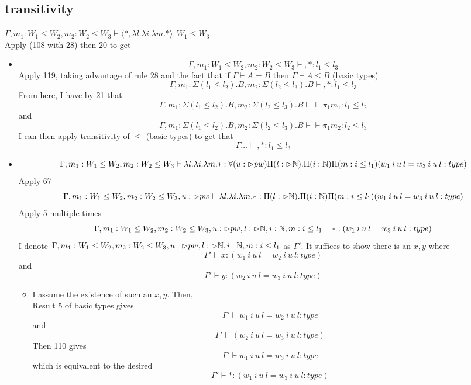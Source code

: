 \documentclass{article}
\begin{document}
\subsection{transitivity}
$\Gamma, m_1: W_1 \leq W_2, m_2 : W_2 \leq W_3 \vdash \langle *,
\lambda l. \lambda i. \lambda m. * \rangle
: W_1 \leq W_3$\\
Apply (108 with 28) then 20 to get
\begin{itemize}
    \item \[\Gamma, m_1: W_1 \leq W_2, m_2 : W_2 \leq W_3 \vdash, *: l_1 \leq l_3\]
    Apply 119, taking advantage of rule 28 and the fact that if $\Gamma \vdash A = B$ then $\Gamma \vdash A \leq B$ (basic types)
    \[\Gamma, m_1: \Sigma(l_1 \leq l_2).B, m_2 :\Sigma(l_2 \leq l_3).B \vdash, *: l_1 \leq l_3\]
    From here, I have by 21 that 
    \[\Gamma, m_1: \Sigma(l_1 \leq l_2).B, m_2 :\Sigma(l_2 \leq l_3).B \vdash \vdash \pi_1 m_1 : l_1 \leq l_2\] and  \[\Gamma, m_1: \Sigma(l_1 \leq l_2).B, m_2 :\Sigma(l_2 \leq l_3).B \vdash \vdash \pi_1 m_2 : l_2 \leq l_3\]
    I can then apply transitivity of $\leq$ (basic types) to get that 
     \[\Gamma \dots \vdash, *: l_1 \leq l_3\]
    \item \[\Gamma, m_1: W_1 \leq W_2, m_2 : W_2 \leq W_3 \vdash \lambda l. \lambda i. \lambda m. *: \forall(u: \rhd pw)\Pi(l: \rhd \mathbb{N}).\Pi(i: \mathbb{N})\Pi(m: i \leq l_1)(w_1 \: i \: u \: l = w_3 \: i \: u \: l : type)\]
    Apply 67
    \[\Gamma, m_1: W_1 \leq W_2, m_2 : W_2 \leq W_3, u: \rhd pw \vdash \lambda l. \lambda i. \lambda m. *: \Pi(l: \rhd \mathbb{N}).\Pi(i: \mathbb{N})\Pi(m: i \leq l_1)(w_1 \: i \: u \: l = w_3 \: i \: u \: l : type)\]
    Apply 5 multiple times
        \[\Gamma, m_1: W_1 \leq W_2, m_2 : W_2 \leq W_3, u: \rhd pw, l : \rhd \mathbb{N}, i: \mathbb{N}, m: i \leq l_1 \vdash *: (w_1 \: i \: u \: l = w_3 \: i \: u \: l : type)\]
        I denote $\Gamma, m_1: W_1 \leq W_2, m_2 : W_2 \leq W_3, u: \rhd pw, l : \rhd \mathbb{N}, i: \mathbb{N}, m: i \leq l_1$ as $\Gamma'$. 
    It suffices to show there is an $x, y$ where
    \[\Gamma' \vdash x : (w_1 \: i \: u \: l = w_2 \: i \: u \: l : type) \]
    and
    \[\Gamma' \vdash y : (w_2 \: i \: u \: l = w_3 \: i \: u \: l : type) \]
    \begin{itemize}
        \item I assume the existence of such an $x, y$. Then,\\
    Result 5 of basic types gives
     \[\Gamma' \vdash w_1 \: i \: u \: l = w_2 \: i \: u \: l : type \] and
       \[\Gamma' \vdash (w_2 \: i \: u \: l = w_3 \: i \: u \: l : type) \]
       Then 110 gives
        \[\Gamma' \vdash w_1 \: i \: u \: l = w_3 \: i \: u \: l : type \]
       which is equivalent to the desired
         \[\Gamma' \vdash *: (w_1 \: i \: u \: l = w_3 \: i \: u \: l : type) \]
         

\end{itemize}
\end{itemize}
\end{document}

